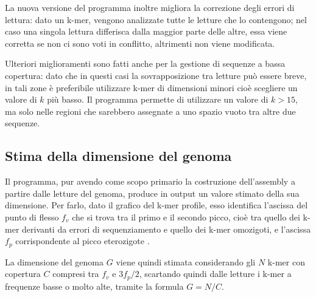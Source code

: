 \documentclass[crop=false, class=book]{standalone}
\begin{document}
	La nuova versione del programma inoltre migliora la correzione degli errori di lettura: dato un k-mer, vengono analizzate tutte le letture che lo contengono; nel caso una singola lettura differisca dalla maggior parte delle altre, essa viene corretta se non ci sono voti in conflitto, altrimenti non viene modificata.
	
	Ulteriori miglioramenti sono fatti anche per la gestione di sequenze a bassa copertura: dato che in questi casi la sovrapposizione tra letture può essere breve, in tali zone è preferibile utilizzare k-mer di dimensioni minori cioè scegliere un valore di $k$ più basso. Il programma permette di utilizzare un valore di $k>15$, ma solo nelle regioni che sarebbero assegnate a uno spazio vuoto tra altre due sequenze. 
	
	\subsection{Stima della dimensione del genoma}
	Il programma, pur avendo come scopo primario la costruzione dell'assembly a partire dalle letture del genoma, produce in output un valore stimato della sua dimensione. Per farlo, dato il grafico del k-mer profile, esso identifica l'ascissa del punto di flesso $f_v$ che si trova tra il primo e il secondo picco, cioè tra quello dei k-mer derivanti da errori di sequenziamento e quello dei k-mer omozigoti, e l'ascissa $f_p$ corrispondente al picco eterozigote \cite{sun2017findGSE}.
	
	La dimensione del genoma $G$ viene quindi stimata considerando gli $N$ k-mer con copertura $C$ compresi tra $f_v$ e $3f_p/2$, scartando quindi dalle letture i k-mer a frequenze basse o molto alte, tramite la formula $G = N/C$.

	
	
	
	
	
	
	
	
\end{document}
